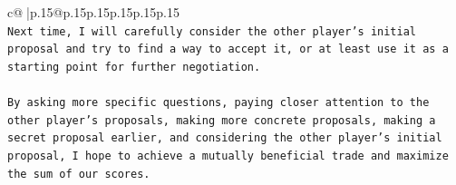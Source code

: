\documentclass{article}
\begin{document}
{\begin{supertabular}{c@{$\;$}|p{.15\linewidth}@{}p{.15\linewidth}p{.15\linewidth}p{.15\linewidth}p{.15\linewidth}p{.15\linewidth}}
{{{\\ 
\texttt{Next time, I will carefully consider the other player's initial proposal and try to find a way to accept it, or at least use it as a starting point for further negotiation. } \\
\\ 
\texttt{By asking more specific questions, paying closer attention to the other player's proposals, making more concrete proposals, making a secret proposal earlier, and considering the other player's initial proposal, I hope to achieve a mutually beneficial trade and maximize the sum of our scores.} \\
            }
        }
    }
     \\ \\

\end{supertabular}
}
\end{document}
